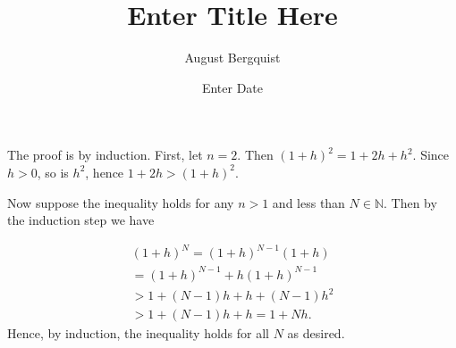 \documentclass[12pt]{article}
\title{Enter Title Here}
\author{August Bergquist}
\date{Enter Date} %
\newcommand{\N}{\mathbb{N}}
\begin{document}
The proof is by induction. First, let $n = 2$. 
Then $(1 + h)^2 = 1 + 2h + h^2$. Since $h > 0$, so is $h^2$, hence $1 + 2h > (1 + h)^2$.

Now suppose the inequality holds for any $n > 1$ and less than $N\in \N$.
Then by the induction step we have

\begin{equation}
    \begin{split}
        (1 + h)^N = (1+h)^{N - 1}(1 + h) \\
        = (1 + h)^{N - 1} + h(1 + h)^{N - 1}\\
        > 1 + (N-1)h + h + (N-1)h^2 \\
        > 1 + (N-1)h + h = 1 + Nh.
    \end{split}
\end{equation} 
Hence, by induction, the inequality holds for all $N$ as desired. 
\end{document}
